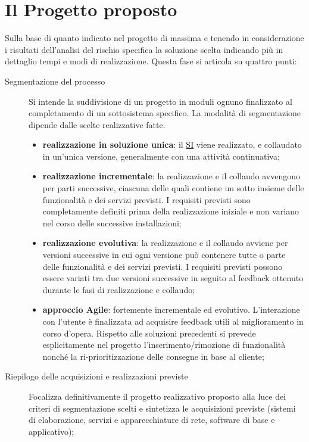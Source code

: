 \section{Il Progetto proposto}\label{sec:ftt_il_progetto_proposto} %
Sulla base di quanto indicato nel progetto di massima e tenendo in considerazione i risultati dell'analisi del rischio specifica la soluzione scelta indicando più in dettaglio tempi e modi di realizzazione.
Questa fase si articola su quattro punti:
\begin{description}
    \item[Segmentazione del processo] Si intende la suddivisione di un progetto in moduli ognuno finalizzato al completamento di un sottosistema specifico.
        La modalità di segmentazione dipende dalle scelte realizzative fatte.
        \begin{itemize}
            \item \textbf{realizzazione in soluzione unica}: il \hyperref[sub:il_sistema_informativo]{SI} viene realizzato, e collaudato in un'unica versione, generalmente con una attività continuativa;
            \item \textbf{realizzazione incrementale}: la realizzazione e il collaudo avvengono per parti successive, ciascuna delle quali contiene un sotto insieme delle funzionalità e dei servizi previsti.
                I requisiti previsti sono completamente definiti prima della realizzazione iniziale e non variano nel corso delle successive installazioni;
            \item \textbf{realizzazione evolutiva}: la realizzazione e il collaudo avviene per versioni successive in cui ogni versione può contenere tutte o parte delle funzionalità e dei servizi previsti.
                I requisiti previsti possono essere variati tra due versioni successive in seguito al feedback ottenuto durante le fasi di realizzazione e collaudo;
            \item \textbf{approccio Agile}: fortemente incrementale ed evolutivo.
                L'interazione con l'utente è finalizzata ad acquisire feedback utili al miglioramento in corso d'opera.
                Rispetto alle soluzioni precedenti si prevede esplicitamente nel progetto l'inserimento/rimozione di funzionalità nonché la ri-prioritizzazione delle consegne in base al cliente;
        \end{itemize}
    \item[Riepilogo delle acquisizioni e realizzazioni previste]  Focalizza definitivamente il progetto realizzativo proposto alla luce dei criteri di segmentazione scelti e sintetizza le acquisizioni previste (sistemi di elaborazione, servizi e apparecchiature di rete, software di base e applicativo);

\end{description}
